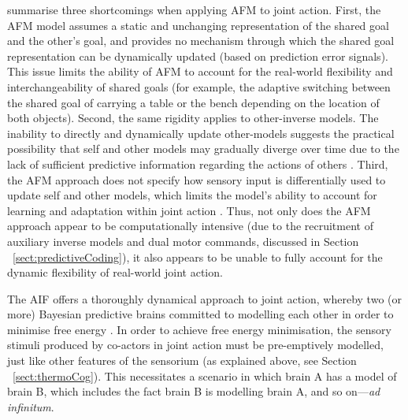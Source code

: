 \begin{CJK}{UTF8}{gbsn}
\textcite{Pesquita2017} summarise three shortcomings when applying AFM to joint action.  First, the AFM model assumes a static and unchanging representation of the shared goal and the other's goal, and provides no mechanism through which the shared goal representation can be dynamically updated (based on prediction error signals).  This issue limits the ability of AFM to account for the real-world flexibility and interchangeability of shared goals (for example, the adaptive switching between the shared goal of carrying a table or the bench depending on the location of both objects).  Second, the same rigidity applies to other-inverse models.  The inability to directly and dynamically update other-models suggests the practical possibility that self and other models may gradually diverge over time due to the lack of sufficient predictive information regarding the actions of others \citep{Pickering2014}. Third, the AFM approach does not specify how sensory input is differentially used to update self and other models, which limits the model's ability to account for learning and adaptation within joint action \citep{Pesquita2017}.  Thus, not only does the AFM approach appear to be computationally intensive (due to the recruitment of auxiliary inverse models and dual motor commands, discussed in Section ~\ref{sect:predictiveCoding}), it also appears to be unable to fully account for the dynamic flexibility of real-world joint action.

The AIF offers a thoroughly dynamical approach to joint action, whereby two (or more) Bayesian predictive brains committed to modelling each other in order to minimise free energy \citep{Friston2015,Friston2015a}. In order to achieve free energy minimisation, the sensory stimuli produced by co-actors in joint action must be pre-emptively modelled, just like other features of the sensorium (as explained above, see Section ~\ref{sect:thermoCog}).  This necessitates a scenario in which brain A has a model of brain B, which includes the fact brain B is modelling brain A, and so on---\textit{ad infinitum}.


\end{CJK}
